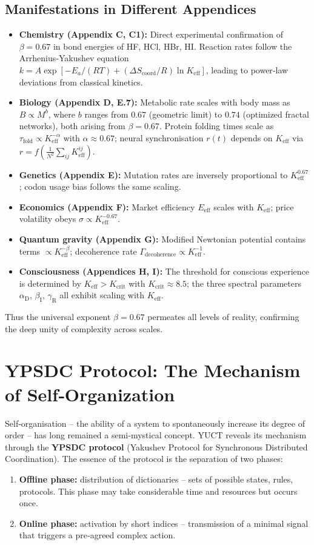 \documentclass[11pt]{article}
\theoremstyle{remark}
\newcommand{\Keff}{K_{\mathrm{eff}}}
\newcommand{\Kcrit}{K_{\mathrm{crit}}}
\newcommand{\alD}{\alpha_{\mathrm{D}}}
\newcommand{\beI}{\beta_{\mathrm{I}}}
\newcommand{\gaR}{\gamma_{\mathrm{R}}}
\begin{document}
	\subsection{Manifestations in Different Appendices}
	\begin{itemize}
		\item \textbf{Chemistry (Appendix C, C1):} Direct experimental confirmation of $\beta = 0.67$ in bond energies of HF, HCl, HBr, HI. Reaction rates follow the Arrhenius‑Yakushev equation $k = A \exp[-E_a/(RT) + (\Delta S_{\text{coord}}/R)\ln\Keff]$, leading to power‑law deviations from classical kinetics.
		\item \textbf{Biology (Appendix D, E.7):} Metabolic rate scales with body mass as $B \propto M^{b}$, where $b$ ranges from $0.67$ (geometric limit) to $0.74$ (optimized fractal networks), both arising from $\beta = 0.67$. Protein folding times scale as $\tau_{\text{fold}} \propto \Keff^{-\alpha}$ with $\alpha \approx 0.67$; neural synchronisation $r(t)$ depends on $\Keff$ via $r = f(\frac{1}{N^2}\sum_{ij}\Keff^{ij})$.
		\item \textbf{Genetics (Appendix E):} Mutation rates are inversely proportional to $\Keff^{0.67}$; codon usage bias follows the same scaling.
		\item \textbf{Economics (Appendix F):} Market efficiency $E_{\text{eff}}$ scales with $\Keff$; price volatility obeys $\sigma \propto \Keff^{-0.67}$.
		\item \textbf{Quantum gravity (Appendix G):} Modified Newtonian potential contains terms $\propto \Keff^{-\beta}$; decoherence rate $\Gamma_{\text{decoherence}} \propto \Keff^{-1}$.
		\item \textbf{Consciousness (Appendices H, I):} The threshold for conscious experience is determined by $\Keff > \Kcrit$ with $\Kcrit \approx 8.5$; the three spectral parameters $\alD$, $\beI$, $\gaR$ all exhibit scaling with $\Keff$.
	\end{itemize}
	
	Thus the universal exponent $\beta = 0.67$ permeates all levels of reality, confirming the deep unity of complexity across scales.
	
	\section{YPSDC Protocol: The Mechanism of Self‑Organization}
	\label{sec:ypsdc}
	
	Self‑organisation – the ability of a system to spontaneously increase its degree of order – has long remained a semi‑mystical concept. YUCT reveals its mechanism through the \textbf{YPSDC protocol} (Yakushev Protocol for Synchronous Distributed Coordination). The essence of the protocol is the separation of two phases:
	\begin{enumerate}
		\item \textbf{Offline phase:} distribution of dictionaries – sets of possible states, rules, protocols. This phase may take considerable time and resources but occurs once.
		\item \textbf{Online phase:} activation by short indices – transmission of a minimal signal that triggers a pre‑agreed complex action.
	\end{enumerate}
	
\end{document}
